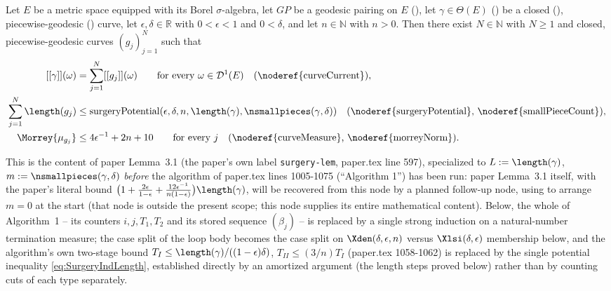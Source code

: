\begin{lemma}
  \label{surgery-induction}
  Let $E$ be a metric space equipped with its Borel $\sigma$-algebra, let $GP$ be a geodesic
  pairing on $E$ (), let $\gamma \in \Theta(E)$ () be a
  closed (), piecewise-geodesic () curve, let
  $\epsilon,\delta \in \mathbb{R}$ with $0<\epsilon<1$ and $0<\delta$, and let $n \in \mathbb{N}$
  with $n>0$. Then there exist $N \in \mathbb{N}$ with $N \ge 1$ and closed, piecewise-geodesic
  curves $(g_j)_{j=1}^N$ such that
  \begin{align}
    \label{eq:SurgeryIndCurrent}
    [[\gamma]](\omega) &= \sum_{j=1}^N [[g_j]](\omega) \qquad\text{for every } \omega \in
    \mathcal{D}^1(E) \quad\text{(\noderef{curveCurrent})}, \\
    \label{eq:SurgeryIndLength}
    \sum_{j=1}^N \length(g_j) &\le \mathrm{surgeryPotential}(\epsilon,\delta,n,\length(\gamma),
    \nsmallpieces(\gamma,\delta)) \quad\text{(\noderef{surgeryPotential}, \noderef{smallPieceCount})},\\
    \label{eq:SurgeryIndMorrey}
    \Morrey{\mu_{g_j}} &\le 4\epsilon^{-1}+2n+10 \qquad\text{for every } j
    \quad\text{(\noderef{curveMeasure}, \noderef{morreyNorm})}.
  \end{align}

  This is the content of paper Lemma~3.1 (the paper's own label \texttt{surgery-lem}, paper.tex
  line 597), specialized to $L:=\length(\gamma)$, $m:=\nsmallpieces(\gamma,\delta)$
  \emph{before} the algorithm of paper.tex lines 1005-1075 (``Algorithm 1'') has been run: paper
  Lemma~3.1 itself, with the paper's literal bound $\bigl(1+\tfrac{2\epsilon}{1-\epsilon}+
  \tfrac{12\epsilon^{-1}}{n(1-\epsilon)}\bigr)\length(\gamma)$, will be recovered from this node
  by a planned follow-up node, using  to arrange $m=0$ at the start
  (that node is outside the present scope; this node supplies its entire mathematical content).
  Below, the whole of Algorithm~1 -- its counters $i,j,T_1,T_2$ and its
  stored sequence $(\beta_j)$ -- is replaced by a single strong induction on a natural-number
  termination measure; the case split of the loop body becomes the case split on
  $\Xden(\delta,\epsilon,n)$ versus $\Xlsi(\delta,\epsilon)$ membership below, and the algorithm's
  own two-stage bound $T_I \le \length(\gamma)/((1-\epsilon)\delta)$, $T_{II}\le(3/n)T_I$ (paper.tex
  1058-1062) is replaced by the single potential inequality \eqref{eq:SurgeryIndLength}, established
  directly by an amortized argument (the length steps proved below) rather
  than by counting cuts of each type separately.


\end{lemma}
